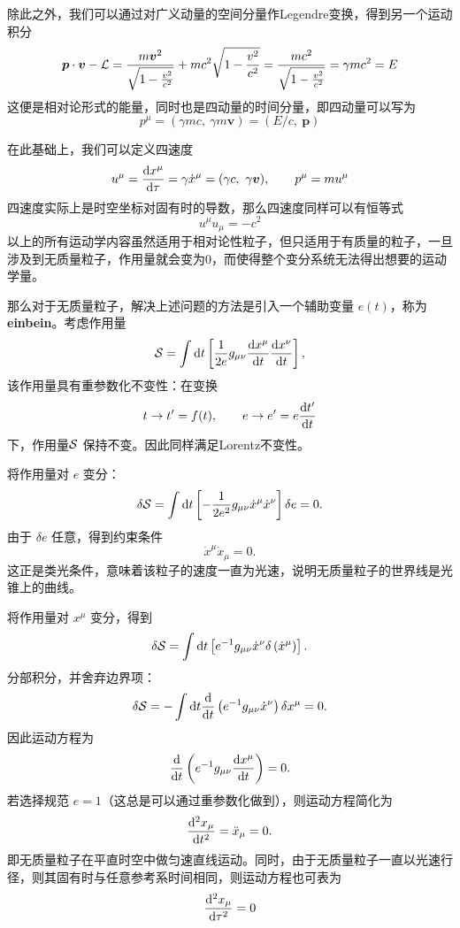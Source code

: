 \documentclass[a4paper]{report}
\begin{document}
除此之外，我们可以通过对广义动量的空间分量作Legendre变换，得到另一个运动积分
\begin{equation}
    \boldsymbol{p}\cdot\boldsymbol{v} - \mathcal{L} =  \frac{m \boldsymbol{v}^2}{\sqrt{1-\frac{v^2}{c^2}}} + mc^2\sqrt{1-\frac{v^2}{c^2}}  = \frac{m c^2}{\sqrt{1-\frac{v^2}{c^2}}}= \gamma m c^2  = E
\end{equation}
这便是相对论形式的能量，同时也是四动量的时间分量，即四动量可以写为
\begin{equation}
    p^\mu = (\gamma m c,~ \gamma m \boldsymbol{v}) = (E/c, ~ \boldsymbol{p})
\end{equation}

在此基础上，我们可以定义四速度
\begin{equation}
    u^\mu =\frac{\mathrm{d} x^\mu}{\mathrm{d}\tau} = \gamma\dot x^\mu = (\gamma c, ~\gamma\boldsymbol{v}),\qquad p^\mu = m u^\mu
\end{equation}
四速度实际上是时空坐标对固有时的导数，那么四速度同样可以有恒等式
\begin{equation}
    u^\mu u_\mu = -c^2
\end{equation}
以上的所有运动学内容虽然适用于相对论性粒子，但只适用于有质量的粒子，一旦涉及到无质量粒子，作用量就会变为0，而使得整个变分系统无法得出想要的运动学量。

那么对于无质量粒子，解决上述问题的方法是引入一个辅助变量 \(e( t)\)，称为\textbf{einbein}。考虑作用量
\begin{equation}
    \mathcal{S} =  \int \mathrm{d} t \left[ \frac{1}{2e} g_{\mu\nu}\frac{\mathrm{d} x^\mu}{\mathrm{d} t}\frac{\mathrm{d} x^\nu}{\mathrm{d} t} \right],
\end{equation}
该作用量具有重参数化不变性：在变换
\begin{equation}
    t\to t' = f(t), \qquad e \to e' = e \frac{\mathrm{d} t'}{\mathrm{d} t}
\end{equation}
下，作用量\(\mathcal{S}\) 保持不变。因此同样满足Lorentz不变性。

将作用量对 \(e\) 变分：
\[
\delta \mathcal{S} =  \int \mathrm{d} t \left[ -\frac{1}{2e^2} g_{\mu\nu} \dot x^\mu \dot x^\nu\right]\delta e = 0.
\]
由于 \(\delta e\) 任意，得到约束条件
\[
\dot x^\mu \dot x_\mu = 0.
\]
这正是类光条件，意味着该粒子的速度一直为光速，说明无质量粒子的世界线是光锥上的曲线。

将作用量对 \(x^\mu\) 变分，得到
\[
\delta \mathcal{S} = \int \mathrm{d} t \left[ e^{-1} g_{\mu\nu} \dot x^\nu \delta\left(   \dot x^\mu \right) \right].
\]
分部积分，并舍弃边界项：
\[
\delta \mathcal{S} = - \int \mathrm{d} t \frac{\mathrm{d}}{\mathrm{d} t}\left( e^{-1} g_{\mu\nu}  \dot x^\nu \right) \delta x^\mu = 0.
\]
因此运动方程为
\[
\frac{\mathrm{d}}{\mathrm{d} t}\left( e^{-1} g_{\mu\nu} \frac{\mathrm{d} x^\mu}{\mathrm{d} t} \right) = 0.
\]
若选择规范 \(e=1\)（这总是可以通过重参数化做到），则运动方程简化为
\[
\frac{\mathrm{d}^2 x_\mu}{\mathrm{d} t^2} =\ddot x_\mu  = 0.
\]
即无质量粒子在平直时空中做匀速直线运动。同时，由于无质量粒子一直以光速行径，则其固有时与任意参考系时间相同，则运动方程也可表为
\begin{equation}
     \frac{\mathrm{d}^2 x_\mu}{\mathrm{d} \tau^2} = 0
\end{equation}
\end{document}
